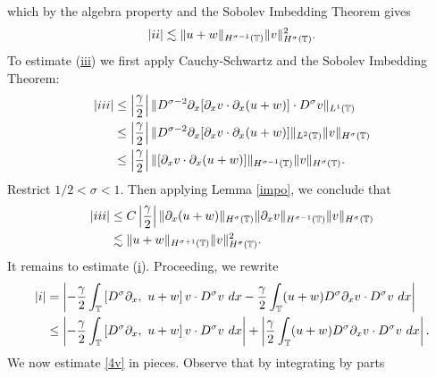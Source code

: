 	which by the algebra property and the Sobolev
	Imbedding Theorem gives
\begin{equation}
		\begin{split}
		|ii| \lesssim \|u+w\|_{H^{\sigma -1}(\mathbb{T})} \|v\|_{H^\sigma(\mathbb{T})}^2.
			\label{3v}
		\end{split}
	\end{equation}
	To estimate (\hyperref[2v]{iii}) we first apply
	Cauchy-Schwartz and the Sobolev Imbedding Theorem:
	\begin{equation*}
		\begin{split}
		|iii| & \le	\left | \frac{\gamma}{2} \right | \|D^{\sigma -2} \partial_x
			[\partial_x v \cdot \partial_x (u+w)] \cdot D^\sigma v  \|_{L^1(\mathbb{T})} 
			\\
			& \le  \left | \frac{\gamma}{2} \right | \|D^{\sigma -2} \partial_x
			[\partial_x v \cdot \partial_x (u+w)] \|_{L^2(\mathbb{T})}
			\|v\|_{H^\sigma(\mathbb{T})}
			\\
			& \le \left |\frac{\gamma}{2} \right|
			\|[\partial_x v \cdot \partial_x (u+w)] \|_{H^{\sigma -1}(\mathbb{T})}
			\|v\|_{H^\sigma(\mathbb{T})}.
		\end{split}
	\end{equation*}
	Restrict $1/2 < \sigma < 1$. Then applying Lemma \ref{impo}, we conclude
	that
	\begin{equation}
		\begin{split}
			|iii|
			& \le C \left | \frac{\gamma}{2} \right |
			\|\partial_x(u+w) \|_{H^{\sigma}(\mathbb{T})}
			\|\partial_x v\|_{H^{\sigma -1}(\mathbb{T})} \|v\|_{H^\sigma(\mathbb{T})}
			\\
			& \lesssim \|u+w \|_{H^{\sigma + 1}(\mathbb{T})}
			\|v\|_{H^\sigma(\mathbb{T})}^2.
			\label{3'v}
		\end{split}
	\end{equation}
	It remains to estimate (\hyperref[2v]{i}).
	Proceeding, we rewrite
	\begin{equation}
		\begin{split}
			|i| & =
			\left |
			-\frac{\gamma}{2} \int_{\mathbb{T}} \left[ D^\sigma \partial_x, \ u+w \right]v \cdot
			D^\sigma v \ dx - \frac{\gamma}{2} \int_{\mathbb{T}} (u+w) D^\sigma
			\partial_x v \cdot D^\sigma v\ dx
			\right | 
			\\
			& \le \left |
			-\frac{\gamma}{2} \int_{\mathbb{T}} \left[ D^\sigma \partial_x, \ u+w \right]v \cdot
			D^\sigma v \ dx \right |
			+ \left | \frac{\gamma}{2} \int_{\mathbb{T}} (u+w) D^\sigma \partial_x v
			\cdot D^\sigma v\
			dx \right |.
			\label{4v}
		\end{split}
	\end{equation}
	We now estimate \eqref{4v} in pieces. Observe that by integrating by parts
